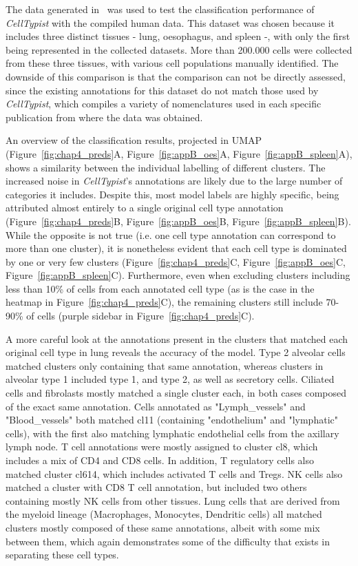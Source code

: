 The data generated in~\citep{madissoon_lung_2019} was used to test the classification performance of \textit{CellTypist} with the compiled human data. This dataset was chosen because it includes three distinct tissues - lung, oesophagus, and spleen -, with only the first being represented in the collected datasets. More than 200.000 cells were collected from these three tissues, with various cell populations manually identified. The downside of this comparison is that the comparison can not be directly assessed, since the existing annotations for this dataset do not match those used by \textit{CellTypist}, which compiles a variety of nomenclatures used in each specific publication from where the data was obtained.

An overview of the classification results, projected in UMAP~\citep{mcinnes_umap:_2018} (Figure~\ref{fig:chap4_preds}A, Figure~\ref{fig:appB_oes}A, Figure~\ref{fig:appB_spleen}A), shows a similarity between the individual labelling of different clusters. The increased noise in \textit{CellTypist}'s annotations are likely due to the large number of categories it includes. Despite this, most model labels are highly specific, being attributed almost entirely to a single original cell type annotation (Figure~\ref{fig:chap4_preds}B, Figure~\ref{fig:appB_oes}B, Figure~\ref{fig:appB_spleen}B). While the opposite is not true (i.e. one cell type annotation can correspond to more than one cluster), it is nonetheless evident that each cell type is dominated by one or very few clusters (Figure~\ref{fig:chap4_preds}C, Figure~\ref{fig:appB_oes}C, Figure~\ref{fig:appB_spleen}C). Furthermore, even when excluding clusters including less than 10\% of cells from each annotated cell type (as is the case in the heatmap in Figure~\ref{fig:chap4_preds}C), the remaining clusters still include 70-90\% of cells (purple sidebar in Figure~\ref{fig:chap4_preds}C). 

A more careful look at the annotations present in the clusters that matched each original cell type in lung reveals the accuracy of the model. Type 2 alveolar cells matched clusters only containing that same annotation, whereas clusters in alveolar type 1 included type 1, and type 2, as well as secretory cells. Ciliated cells and fibrolasts mostly matched a single cluster each, in both cases composed of the exact same annotation. Cells annotated as "Lymph\_vessels" and "Blood\_vessels" both matched cl11 (containing "endothelium" and "lymphatic" cells), with the first also matching lymphatic endothelial cells from the axillary lymph node. T cell annotations were mostly assigned to cluster cl8, which includes a mix of CD4 and CD8 cells. In addition, T regulatory cells also matched cluster cl614, which includes activated T cells and Tregs. NK cells also matched a cluster with CD8 T cell annotation, but included two others containing mostly NK cells from other tissues. Lung cells that are derived from the myeloid lineage (Macrophages, Monocytes, Dendritic cells) all matched clusters mostly composed of these same annotations, albeit with some mix between them, which again demonstrates some of the difficulty that exists in separating these cell types.

